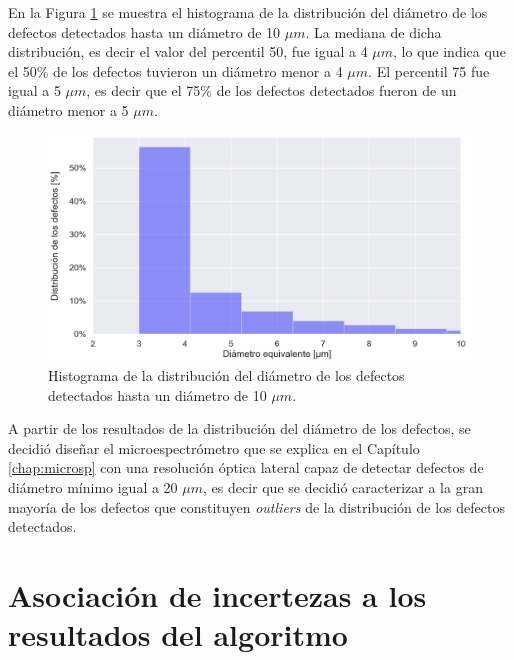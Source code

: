 En la Figura \ref{fig:boxpl} se muestra el histograma de la distribución del diámetro de los defectos detectados hasta un diámetro de 10 $\mu m$. La mediana de dicha distribución, es decir el valor del percentil 50, fue igual a 4 $\mu m$, lo que indica que el 50\% de los defectos tuvieron un diámetro menor a 4 $\mu m$. El percentil 75 fue igual a 5 $\mu m$, es decir que el 75\% de los defectos detectados fueron de un diámetro menor a 5 $\mu m$.
\begin{figure}
\centering
\includegraphics[width=1.0\textwidth]{Figs/cuantificaciondefectos/chauboxx.png}
\caption{Histograma de la distribución del diámetro de los defectos detectados hasta un diámetro de 10 $\mu m$.}
\label{fig:boxpl}
\end{figure}
A partir de los resultados de la distribución del diámetro de los defectos, se decidió diseñar el microespectrómetro que se explica en el Capítulo \ref{chap:microsp} con una resolución óptica lateral capaz de detectar defectos de diámetro mínimo igual a 20 $\mu m$, es decir que se decidió caracterizar a la gran mayoría de los defectos que constituyen \textit{outliers} de la distribución de los defectos detectados.


\singlespacing
\section{Asociación de incertezas a los resultados del algoritmo}
\label{sec:incert}

